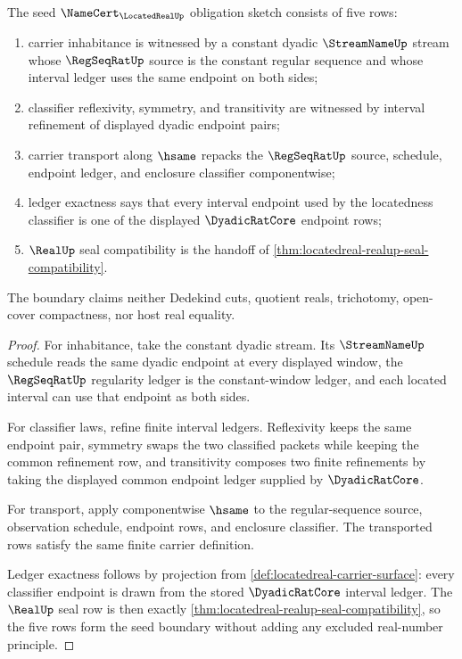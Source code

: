 \begin{theorem}
\label{thm:locatedreal-namecert-boundary}
The seed $\NameCert_{\LocatedRealUp}$ obligation sketch consists of five rows:
\begin{enumerate}
\item carrier inhabitance is witnessed by a constant dyadic $\StreamNameUp$ stream whose $\RegSeqRatUp$ source is the constant regular sequence and whose interval ledger uses the same endpoint on both sides;
\item classifier reflexivity, symmetry, and transitivity are witnessed by interval refinement of displayed dyadic endpoint pairs;
\item carrier transport along $\hsame$ repacks the $\RegSeqRatUp$ source, schedule, endpoint ledger, and enclosure classifier componentwise;
\item ledger exactness says that every interval endpoint used by the locatedness classifier is one of the displayed $\DyadicRatCore$ endpoint rows;
\item $\RealUp$ seal compatibility is the handoff of \autoref{thm:locatedreal-realup-seal-compatibility}.
\end{enumerate}
The boundary claims neither Dedekind cuts, quotient reals, trichotomy, open-cover compactness, nor host real equality.
\end{theorem}
\begin{proof}
For inhabitance, take the constant dyadic stream. Its $\StreamNameUp$ schedule reads the same dyadic endpoint at every displayed window, the $\RegSeqRatUp$ regularity ledger is the constant-window ledger, and each located interval can use that endpoint as both sides.

For classifier laws, refine finite interval ledgers. Reflexivity keeps the same endpoint pair, symmetry swaps the two classified packets while keeping the common refinement row, and transitivity composes two finite refinements by taking the displayed common endpoint ledger supplied by $\DyadicRatCore$.

For transport, apply componentwise $\hsame$ to the regular-sequence source, observation schedule, endpoint rows, and enclosure classifier. The transported rows satisfy the same finite carrier definition.

Ledger exactness follows by projection from \autoref{def:locatedreal-carrier-surface}: every classifier endpoint is drawn from the stored $\DyadicRatCore$ interval ledger. The $\RealUp$ seal row is then exactly \autoref{thm:locatedreal-realup-seal-compatibility}, so the five rows form the seed boundary without adding any excluded real-number principle.
\end{proof}

